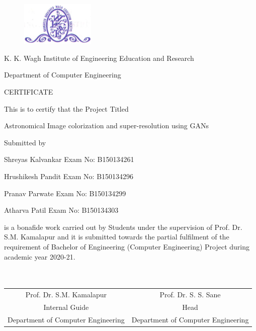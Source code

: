 \documentclass[oneside,a4paper,12pt]{report}
\begin{document}
\newpage



\begin{figure}[ht]
\centering
\includegraphics[width=100pt]{collegelogo.png}
\end{figure}


{\bfseries \fontsize{14}{12} \selectfont \centerline{K. K. Wagh Institute of Engineering Education and Research}
\centerline{Department of Computer Engineering}
\vspace*{3\baselineskip}}


{\bfseries \fontsize{16}{12} \selectfont \centerline{CERTIFICATE}
\vspace*{3\baselineskip}}

\centerline{This is to certify that the Project Titled}
\vspace*{1\baselineskip}


{\bfseries \fontsize{14}{12} \selectfont \centerline{Astronomical Image colorization and super-resolution using GANs}
\vspace*{1\baselineskip}}

\centerline{Submitted by}
\vspace*{1\baselineskip}
\centerline{Shreyas Kalvankar  \hspace{25 mm} Exam No: B150134261}
\centerline{Hrushikesh Pandit \hspace{25 mm} Exam No: B150134296 }
\centerline{Pranav Parwate \hspace{30 mm} Exam No: B150134299}
\centerline{Atharva Patil \hspace{34 mm} Exam No: B150134303}
\vspace*{1\baselineskip}
is a bonafide work carried out by Students under the supervision of Prof. Dr. S.M. Kamalapur and it
is submitted towards the partial fulfilment of the requirement of Bachelor of Engineering (Computer Engineering) Project during academic year 2020-21.\\\\\\

\bgroup
\def\arraystretch{0.7}
\begin{tabular}{c c }
Prof. Dr. S.M. Kamalapur &  \hspace{25 mm} Prof. Dr. S. S. Sane \\
Internal Guide   &  \hspace{25 mm} Head \\
Department of Computer Engineering  &	\hspace{25 mm}Department of Computer Engineering  \\
\end{tabular}
\end{document}
